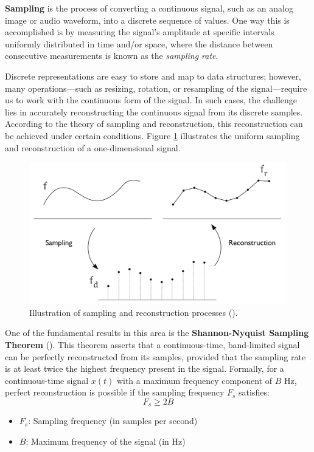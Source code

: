 \textbf{Sampling} is the process of converting a continuous signal, such as an analog image or audio waveform, into a discrete sequence of values. One way this is accomplished is by measuring the signal's amplitude at specific intervals uniformly distributed in time and/or space, where the distance between consecutive measurements is known as the \textit{sampling rate}.

Discrete representations are easy to store and map to data structures; however, many operations—such as resizing, rotation, or resampling of the signal—require us to work with the continuous form of the signal. In such cases, the challenge lies in accurately reconstructing the continuous signal from its discrete samples. According to the theory of sampling and reconstruction, this reconstruction can be achieved under certain conditions. Figure \ref{f:sampling-reconstuction} illustrates the uniform sampling and reconstruction of a one-dimensional signal.


\begin{figure}[!h]
  \centering
  \includegraphics[width=0.85\linewidth]{img/ch2/sampling-reconstruction.png}
  \caption{Illustration of sampling and reconstruction processes (\cite{ipcgVelho2014}).}
  \label{f:sampling-reconstuction}
\end{figure}


One of the fundamental results in this area is the \textbf{Shannon-Nyquist Sampling Theorem} (\cite{Shannon1949}). This theorem asserts that a continuous-time, band-limited signal can be perfectly reconstructed from its samples, provided that the sampling rate is at least twice the highest frequency present in the signal. Formally, for a continuous-time signal \( x(t) \) with a maximum frequency component of \( B \) Hz, perfect reconstruction is possible if the sampling frequency \( F_s \) satisfies:
\[
F_s \geq 2B
\]

\begin{itemize}
  \item \( F_s \): Sampling frequency (in samples per second)
  \item \( B \): Maximum frequency of the signal (in Hz)
\end{itemize}

